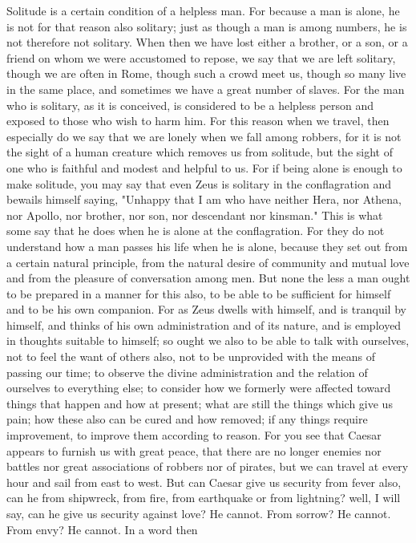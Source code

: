 \documentclass[a4paper]{article}
\begin{document}
    Solitude is a certain condition of a helpless man. For because a man is
alone, he is not for that reason also solitary; just as though a man is among
numbers, he is not therefore not solitary. When then we have lost either a
brother, or a son, or a friend on whom we were accustomed to repose, we say
that we are left solitary, though we are often in Rome, though such a crowd
meet us, though so many live in the same place, and sometimes we have a great
number of slaves. For the man who is solitary, as it is conceived, is
considered to be a helpless person and exposed to those who wish to harm him.
For this reason when we travel, then especially do we say that we are lonely
when we fall among robbers, for it is not the sight of a human creature which
removes us from solitude, but the sight of one who is faithful and modest and
helpful to us. For if being alone is enough to make solitude, you may say that
even Zeus is solitary in the conflagration and bewails himself saying, "Unhappy
that I am who have neither Hera, nor Athena, nor Apollo, nor brother, nor son,
nor descendant nor kinsman." This is what some say that he does when he is
alone at the conflagration. For they do not understand how a man passes his
life when he is alone, because they set out from a certain natural principle,
from the natural desire of community and mutual love and from the pleasure of
conversation among men. But none the less a man ought to be prepared in a
manner for this also, to be able to be sufficient for himself and to be his own
companion. For as Zeus dwells with himself, and is tranquil by himself, and
thinks of his own administration and of its nature, and is employed in thoughts
suitable to himself; so ought we also to be able to talk with ourselves, not to
feel the want of others also, not to be unprovided with the means of passing
our time; to observe the divine administration and the relation of ourselves to
everything else; to consider how we formerly were affected toward things that
happen and how at present; what are still the things which give us pain; how
these also can be cured and how removed; if any things require improvement, to
improve them according to reason.
    For you see that Caesar appears to furnish us with great peace, that there
are no longer enemies nor battles nor great associations of robbers nor of
pirates, but we can travel at every hour and sail from east to west. But can
Caesar give us security from fever also, can he from shipwreck, from fire, from
earthquake or from lightning? well, I will say, can he give us security against
love? He cannot. From sorrow? He cannot. From envy? He cannot. In a word then
\end{document}
